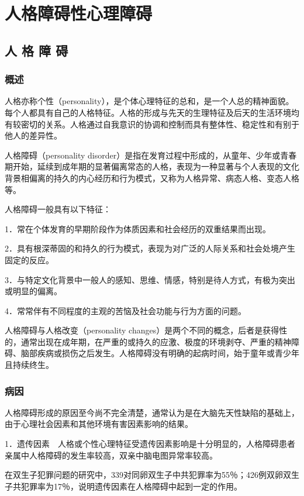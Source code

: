 \chapter{人格障碍性心理障碍}

\section{人 格 障 碍}

\subsection{概述}

人格亦称个性（personality），是个体心理特征的总和，是一个人总的精神面貌。每个人都具有自己的人格特征。人格的形成与先天的生理特征及后天的生活环境均有较密切的关系。人格通过自我意识的协调和控制而具有整体性、稳定性和有别于他人的差异性。

人格障碍（personality
disorder）是指在发育过程中形成的，从童年、少年或青春期开始，延续到成年期的显著偏离常态的人格，表现为一种显著与个人表现的文化背景相偏离的持久的内心经历和行为模式，又称为人格异常、病态人格、变态人格等。

人格障碍一般具有以下特征：

1．常在个体发育的早期阶段作为体质因素和社会经历的双重结果而出现。

2．具有根深蒂固的和持久的行为模式，表现为对广泛的人际关系和社会处境产生固定的反应。

3．与特定文化背景中一般人的感知、思维、情感，特别是待人方式，有极为突出或明显的偏离。

4．常常伴有不同程度的主观的苦恼及社会功能与行为方面的问题。

人格障碍与人格改变（personality
changes）是两个不同的概念，后者是获得性的，通常出现在成年期，在严重的或持久的应激、极度的环境剥夺、严重的精神障碍、脑部疾病或损伤之后发生。人格障碍没有明确的起病时间，始于童年或青少年且持续终生。

\subsection{病因}

人格障碍形成的原因至今尚不完全清楚，通常认为是在大脑先天性缺陷的基础上，由于心理社会因素和其他环境有害因素影响的结果。

1．遗传因素　人格或个性心理特征受遗传因素影响是十分明显的，人格障碍患者亲属中人格障碍的发生率较高，双亲中脑电图异常率较高。

在双生子犯罪问题的研究中，339对同卵双生子中共犯罪率为55％；426例双卵双生子共犯罪率为17％，说明遗传因素在人格障碍中起到一定的作用。


